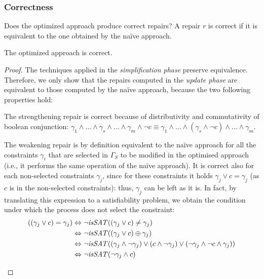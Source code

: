 \begin{tikzborder}{\cite{Gargantini16:validation}}
\begin{tikzborder}{\cite{gargantini_combinatorial_2017}}
\begin{tikzborder}{\cite{garn2019}}
\begin{tikzborder}{\cite{arcaini2019achieving}}
\begin{tikzborder}{\cite{arcaini2019varivolution}}
		\subsubsection{Correctness}
		
		\bb Does the optimized approach produce correct repairs? A repair $r$ is correct if it is equivalent to the one obtained by the na{\"i}ve approach.
		
		\begin{thm}\label{thm:correctnessOptmised}
			The optimized approach is correct.
		\end{thm}
		
		\begin{proof}
			The techniques applied in the \emph{simplification phase} preserve equivalence. Therefore, we only show that the repairs computed in the \emph{update phase} are equivalent to those computed by the na{\"i}ve approach, because the two following properties hold:
			\begin{compactitem}
				\item The strengthening repair is correct because of distributivity and commutativity of boolean conjunction: $\gamma_1 \wedge \ldots \wedge \gamma_s \wedge \ldots \wedge \gamma_m \wedge \neg c \equiv \gamma_1 \wedge \ldots \wedge (\gamma_s \wedge \neg c) \wedge \ldots \wedge \gamma_m$.
				\item The weakening repair is by definition equivalent to the na{\"i}ve approach for all the constraints $\gamma_i$ that are selected in $\Gamma_S$ to be modified in the optimised approach (i.e., it performs the same operation of the na{\"i}ve approach). It is correct also for each non-selected constraints $\gamma_j$, since for these constraints it holds $\gamma_j \vee c = \gamma_j$ (as $c$ is \false in the non-selected constraints): thus, $\gamma_j$ can be left as it is. In fact, by translating this expression to a satisfiability problem, we obtain the condition under which the process does not select the constraint:
				\begin{align*}
				((\gamma_j \vee c) = \gamma_j) &\Leftrightarrow \neg \mathit{isSAT}((\gamma_j \vee c) \neq \gamma_j) \\
				& \Leftrightarrow \neg \mathit{isSAT}( (\gamma_j \vee c) \oplus \gamma_j) \\
				& \Leftrightarrow \neg \mathit{isSAT}( (\gamma_j \wedge \neg \gamma_j) \vee (c \wedge \neg \gamma_j) \vee (\neg \gamma_j \wedge \neg c \wedge \gamma_j) ) \\
				& \Leftrightarrow \neg \mathit{isSAT}(\neg \gamma_j \wedge c) \\
				\end{align*}
			\end{compactitem}
		\end{proof}\be
		

\end{tikzborder}
\end{tikzborder}
\end{tikzborder}
\end{tikzborder}
\end{tikzborder}
